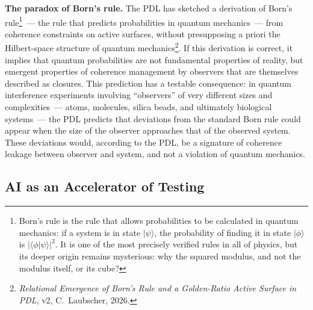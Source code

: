 \documentclass[12pt, a4paper, openright]{book}
\begin{document}
\medskip

\textbf{The paradox of Born's rule.} The PDL has sketched a derivation of Born's rule\footnote{Born's rule is the rule that allows probabilities to be calculated in quantum mechanics: if a system is in state $|\psi\rangle$, the probability of finding it in state $|\phi\rangle$ is $|\langle\phi|\psi\rangle|^2$. It is one of the most precisely verified rules in all of physics, but its deeper origin remains mysterious: why the squared modulus, and not the modulus itself, or its cube?}~--- the rule that predicts probabilities in quantum mechanics~--- from coherence constraints on active surfaces, without presupposing a priori the Hilbert-space structure of quantum mechanics\footnote{\textit{Relational Emergence of Born's Rule and a Golden-Ratio Active Surface in PDL}, v2, C.~Laubscher, 2026.}. If this derivation is correct, it implies that quantum probabilities are not fundamental properties of reality, but emergent properties of coherence management by observers that are themselves described as closures. This prediction has a testable consequence: in quantum interference experiments involving ``observers'' of very different sizes and complexities~--- atoms, molecules, silica beads, and ultimately biological systems~--- the PDL predicts that deviations from the standard Born rule could appear when the size of the observer approaches that of the observed system. These deviations would, according to the PDL, be a signature of coherence leakage between observer and system, and not a violation of quantum mechanics.

\subsection*{AI as an Accelerator of Testing}
\end{document}
